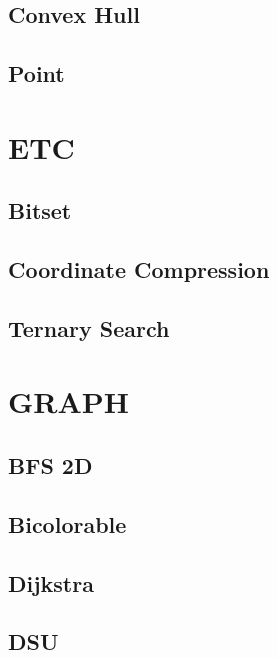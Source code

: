 \subsection{Convex Hull}
\raggedbottom
\hrulefill
\subsection{Point}
\raggedbottom
\hrulefill

\section{ETC}
\subsection{Bitset}
\raggedbottom
\hrulefill
\subsection{Coordinate Compression}
\raggedbottom
\hrulefill
\subsection{Ternary Search}
\raggedbottom
\hrulefill

\section{GRAPH}
\subsection{BFS 2D}
\raggedbottom
\hrulefill
\subsection{Bicolorable}
\raggedbottom
\hrulefill
\subsection{Dijkstra}
\raggedbottom
\hrulefill
\subsection{DSU}
\raggedbottom
\hrulefill
